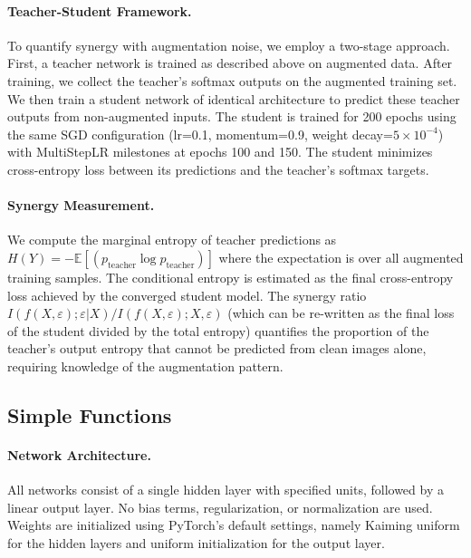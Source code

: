 \documentclass{article}
\theoremstyle{definition}
\theoremstyle{remark}
\begin{document}
\paragraph{Teacher-Student Framework.} To quantify synergy with augmentation noise, we employ a two-stage approach. First, a teacher network is trained as described above on augmented data. After training, we collect the teacher's softmax outputs on the augmented training set. We then train a student network of identical architecture to predict these teacher outputs from non-augmented inputs. The student is trained for 200 epochs using the same SGD configuration (lr=0.1, momentum=0.9, weight decay=$5 \times 10^{-4}$) with MultiStepLR milestones at epochs 100 and 150. The student minimizes cross-entropy loss between its predictions and the teacher's softmax targets.

\paragraph{Synergy Measurement.} We compute the marginal entropy of teacher predictions as $H(Y) = -\mathbb{E}[(p_{\text{teacher}} \log p_{\text{teacher}})]$ where the expectation is over all augmented training samples. The conditional entropy is estimated as the final cross-entropy loss achieved by the converged student model. The synergy ratio $I(f(X,\varepsilon); \varepsilon|X) / I(f(X,\varepsilon); X,\varepsilon)$ (which can be re-written as the final loss of the student divided by the total entropy) quantifies the proportion of the teacher's output entropy that cannot be predicted from clean images alone, requiring knowledge of the augmentation pattern.

\subsection{Simple Functions}
\label{app:simple_functions}

\paragraph{Network Architecture.} All networks consist of a single hidden layer with specified units, followed by a linear output layer. No bias terms, regularization, or normalization are used. Weights are initialized using PyTorch's default settings, namely Kaiming uniform for the hidden layers and uniform initialization for the output layer.
\end{document}
